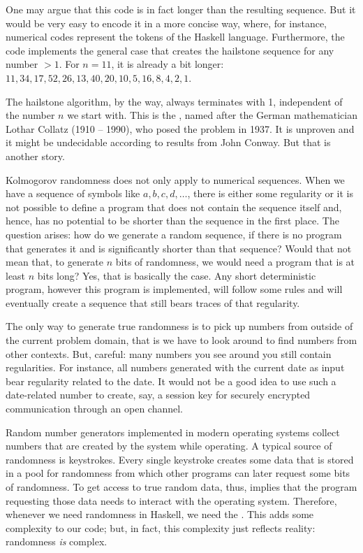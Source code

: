 \documentclass{scrreprt}
\newcommand{\texfamily}{\fontfamily{cmtex}\selectfont}
\newcommand{\Sp}{\hskip.33334em\relax}
\begin{document}
One may argue that this code is in fact longer
than the resulting sequence. 
But it would be very easy to encode it in a
more concise way, where, for instance,
numerical codes represent the tokens of
the Haskell language. Furthermore,
the code implements the general case that creates
the hailstone sequence for any number $>1$.
For $n=11$, it is already a bit longer:
$11,34,17,52,26,13,40,20,10,5,16,8,4,2,1$.

The hailstone algorithm, by the way,
always terminates with 1, independent of the number $n$
we start with.
This is the ,
named after the German mathematician 
Lothar Collatz (1910 -- 1990),
who posed the problem in 1937.
It is unproven and it might be undecidable
according to results from John Conway.
But that is another story.

Kolmogorov randomness 
does not only apply to numerical sequences.
When we have a sequence of symbols like
$a,b,c,d,\dots$, there is either some regularity
or it is not possible to define a program
that does not contain the sequence itself and,
hence, has no potential to be shorter
than the sequence in the first place.
The question arises:
how do we generate a random sequence,
if there is no program that generates it
and is significantly shorter than that sequence?
Would that not mean that,
to generate $n$ bits of randomness,
we would need a program that is at least $n$ bits long?
Yes, that is basically the case.
Any short deterministic program,
however this program is implemented,
will follow some rules and will eventually
create a sequence that still bears traces
of that regularity.

The only way to generate true randomness
is to pick up numbers from outside of
the current problem domain, that is
we have to look around to find numbers
from other contexts. 
But, careful: many numbers you see around you still
contain regularities. For instance,
all numbers generated with the current date
as input bear regularity related to the date.
It would not be a good idea to use such a date-related
number to create, say, a session key for
securely encrypted communication through an open channel.

Random number generators implemented in modern
operating systems collect numbers
that are created by the system while operating.
A typical source of randomness is keystrokes.
Every single keystroke creates some data
that is stored in a pool 
for randomness from which other programs
can later request some bits of randomness.
To get access to true random data, thus, implies
that the program requesting those data
needs to interact with the operating system.
Therefore, whenever we need randomness
in Haskell, we need the \text{\texfamily {\itshape IO}\Sp {\itshape Monad}}. 
This adds some complexity to our code;
but, in fact, this complexity just reflects
reality: randomness \emph{is} complex.
\end{document}
